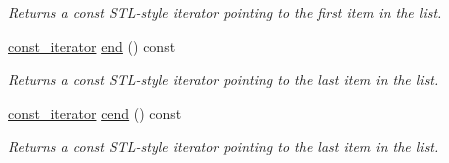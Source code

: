 \begin{DoxyCompactItemize}
\begin{DoxyCompactList}\small\item\em Returns a const S\+T\+L-\/style iterator pointing to the first item in the list. \end{DoxyCompactList}\item 
\hyperlink{class_mdt_1_1_file_system_1_1_path_list_a16481fc90e2859c52398bd361fb69cec}{const\+\_\+iterator} \hyperlink{class_mdt_1_1_file_system_1_1_path_list_a869fc0ec8a4c0c74037e611f55a1a408}{end} () const \hypertarget{class_mdt_1_1_file_system_1_1_path_list_a869fc0ec8a4c0c74037e611f55a1a408}{}\label{class_mdt_1_1_file_system_1_1_path_list_a869fc0ec8a4c0c74037e611f55a1a408}

\begin{DoxyCompactList}\small\item\em Returns a const S\+T\+L-\/style iterator pointing to the last item in the list. \end{DoxyCompactList}\item 
\hyperlink{class_mdt_1_1_file_system_1_1_path_list_a16481fc90e2859c52398bd361fb69cec}{const\+\_\+iterator} \hyperlink{class_mdt_1_1_file_system_1_1_path_list_a307fae83a735e0a91d3cc0f935ee77c1}{cend} () const \hypertarget{class_mdt_1_1_file_system_1_1_path_list_a307fae83a735e0a91d3cc0f935ee77c1}{}\label{class_mdt_1_1_file_system_1_1_path_list_a307fae83a735e0a91d3cc0f935ee77c1}

\begin{DoxyCompactList}\small\item\em Returns a const S\+T\+L-\/style iterator pointing to the last item in the list. \end{DoxyCompactList}\end{DoxyCompactItemize}
